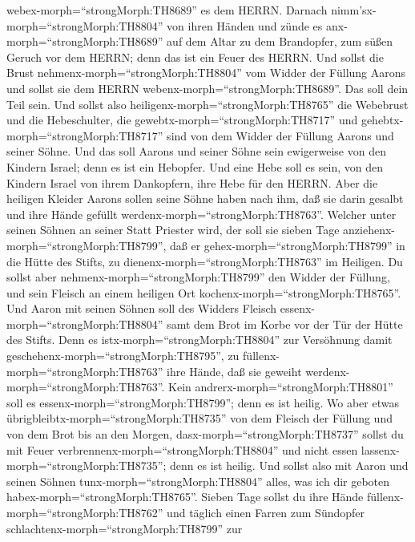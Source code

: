 webex-morph=``strongMorph:TH8689'' es dem HERRN.  Darnach
nimm'sx-morph=``strongMorph:TH8804'' von ihren Händen und zünde es
anx-morph=``strongMorph:TH8689'' auf dem Altar zu dem Brandopfer, zum
süßen Geruch vor dem HERRN; denn das ist ein Feuer des HERRN.
 Und sollst die Brust nehmenx-morph=``strongMorph:TH8804''
vom Widder der Füllung Aarons und sollst sie dem HERRN
webenx-morph=``strongMorph:TH8689''. Das soll dein Teil sein.
 Und sollst also heiligenx-morph=``strongMorph:TH8765'' die
Webebrust und die Hebeschulter, die gewebtx-morph=``strongMorph:TH8717''
und gehebtx-morph=``strongMorph:TH8717'' sind von dem Widder der Füllung
Aarons und seiner Söhne.  Und das soll Aarons und seiner
Söhne sein ewigerweise von den Kindern Israel; denn es ist ein Hebopfer.
Und eine Hebe soll es sein, von den Kindern Israel von ihrem Dankopfern,
ihre Hebe für den HERRN.  Aber die heiligen Kleider Aarons
sollen seine Söhne haben nach ihm, daß sie darin gesalbt und ihre Hände
gefüllt werdenx-morph=``strongMorph:TH8763''.  Welcher
unter seinen Söhnen an seiner Statt Priester wird, der soll sie sieben
Tage anziehenx-morph=``strongMorph:TH8799'', daß er
gehex-morph=``strongMorph:TH8799'' in die Hütte des Stifts, zu
dienenx-morph=``strongMorph:TH8763'' im Heiligen.  Du
sollst aber nehmenx-morph=``strongMorph:TH8799'' den Widder der Füllung,
und sein Fleisch an einem heiligen Ort
kochenx-morph=``strongMorph:TH8765''.  Und Aaron mit seinen
Söhnen soll des Widders Fleisch essenx-morph=``strongMorph:TH8804'' samt
dem Brot im Korbe vor der Tür der Hütte des Stifts.  Denn
es istx-morph=``strongMorph:TH8804'' zur Versöhnung damit
geschehenx-morph=``strongMorph:TH8795'', zu
füllenx-morph=``strongMorph:TH8763'' ihre Hände, daß sie geweiht
werdenx-morph=``strongMorph:TH8763''. Kein
andrerx-morph=``strongMorph:TH8801'' soll es
essenx-morph=``strongMorph:TH8799''; denn es ist heilig. 
Wo aber etwas übrigbleibtx-morph=``strongMorph:TH8735'' von dem Fleisch
der Füllung und von dem Brot bis an den Morgen,
dasx-morph=``strongMorph:TH8737'' sollst du mit Feuer
verbrennenx-morph=``strongMorph:TH8804'' und nicht essen
lassenx-morph=``strongMorph:TH8735''; denn es ist heilig. 
Und sollst also mit Aaron und seinen Söhnen
tunx-morph=``strongMorph:TH8804'' alles, was ich dir geboten
habex-morph=``strongMorph:TH8765''. Sieben Tage sollst du ihre Hände
füllenx-morph=``strongMorph:TH8762''  und täglich einen
Farren zum Sündopfer schlachtenx-morph=``strongMorph:TH8799'' zur
